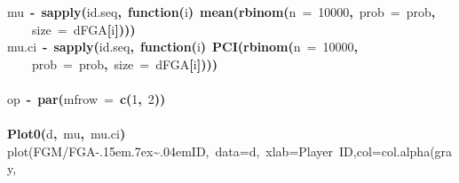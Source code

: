 \documentclass{article}
\makeatletter
\newcommand{\hlnumber}[1]{\textcolor[rgb]{0,0,0}{#1}}%
\newcommand{\hlfunctioncall}[1]{\textcolor[rgb]{.5,0,.33}{\textbf{#1}}}%
\newcommand{\hlkeyword}[1]{\textbf{#1}}%
\newcommand{\hlargument}[1]{\textcolor[rgb]{.69,.25,.02}{#1}}%
\newcommand{\hlcomment}[1]{\textcolor[rgb]{.18,.6,.34}{#1}}%
\newcommand{\hlformalargs}[1]{\hlargument{#1}}%
\newcommand{\hlassignement}[1]{\textbf{#1}}%
\newcommand{\hlsymbol}[1]{#1}%
\def\urltilda{\kern -.15em\lower .7ex\hbox{\~{}}\kern .04em}%
\newcommand{\hlstd}[1]{\textcolor[rgb]{0,0,0}{#1}}%
\newenvironment{kframe}{%
 \def\FrameCommand##1{\hskip\@totalleftmargin \hskip-\fboxsep
 \colorbox{shadecolor}{##1}\hskip-\fboxsep
     \hskip-\linewidth \hskip-\@totalleftmargin \hskip\columnwidth}%
 \MakeFramed {\advance\hsize-\width
   \@totalleftmargin\z@ \linewidth\hsize
   \@setminipage}}%
 {\par\unskip\endMakeFramed}
\newenvironment{knitrout}{}{} %
\makeatother
\begin{document}
\begin{knitrout}
{\begin{kframe}
\begin{flushleft}
\hlstd{}\hlsymbol{mu}{\ }\hlassignement{\usebox{\hlnormalsizeboxlessthan}-}{\ }\hlfunctioncall{sapply}\hlkeyword{(}\hlsymbol{id.seq}\hlkeyword{,}{\ }\hlkeyword{function}\hlkeyword{(}\hlformalargs{i}\hlkeyword{)}{\ }\hlfunctioncall{mean}\hlkeyword{(}\hlfunctioncall{rbinom}\hlkeyword{(}\hlargument{n}{\ }\hlargument{=}{\ }\hlnumber{10000}\hlkeyword{,}{\ }\hlargument{prob}{\ }\hlargument{=}{\ }\hlsymbol{prob}\hlkeyword{,}\hspace*{\fill}\\
\hlstd{}{\ }{\ }{\ }{\ }\hlargument{size}{\ }\hlargument{=}{\ }\hlsymbol{d}\hlkeyword{\usebox{\hlnormalsizeboxdollar}}\hlsymbol{FGA}\hlkeyword{[}\hlsymbol{i}\hlkeyword{]}\hlkeyword{)}\hlkeyword{)}\hlkeyword{)}\hspace*{\fill}\\
\hlstd{}\hlsymbol{mu.ci}{\ }\hlassignement{\usebox{\hlnormalsizeboxlessthan}-}{\ }\hlfunctioncall{sapply}\hlkeyword{(}\hlsymbol{id.seq}\hlkeyword{,}{\ }\hlkeyword{function}\hlkeyword{(}\hlformalargs{i}\hlkeyword{)}{\ }\hlfunctioncall{PCI}\hlkeyword{(}\hlfunctioncall{rbinom}\hlkeyword{(}\hlargument{n}{\ }\hlargument{=}{\ }\hlnumber{10000}\hlkeyword{,}\hspace*{\fill}\\
\hlstd{}{\ }{\ }{\ }{\ }\hlargument{prob}{\ }\hlargument{=}{\ }\hlsymbol{prob}\hlkeyword{,}{\ }\hlargument{size}{\ }\hlargument{=}{\ }\hlsymbol{d}\hlkeyword{\usebox{\hlnormalsizeboxdollar}}\hlsymbol{FGA}\hlkeyword{[}\hlsymbol{i}\hlkeyword{]}\hlkeyword{)}\hlkeyword{)}\hlkeyword{)}\hspace*{\fill}\\
\hlstd{}\hspace*{\fill}\\
\hlstd{}\hlsymbol{op}{\ }\hlassignement{\usebox{\hlnormalsizeboxlessthan}-}{\ }\hlfunctioncall{par}\hlkeyword{(}\hlargument{mfrow}{\ }\hlargument{=}{\ }\hlfunctioncall{c}\hlkeyword{(}\hlnumber{1}\hlkeyword{,}{\ }\hlnumber{2}\hlkeyword{)}\hlkeyword{)}\hspace*{\fill}\\
\hlstd{}\hspace*{\fill}\\
\hlstd{}\hlfunctioncall{Plot0}\hlkeyword{(}\hlsymbol{d}\hlkeyword{,}{\ }\hlsymbol{mu}\hlkeyword{,}{\ }\hlsymbol{mu.ci}\hlkeyword{)}\hspace*{\fill}\\
\hlstd{}\hlcomment{\usebox{\hlnormalsizeboxhash}\usebox{\hlnormalsizeboxhash}{\ }plot(FGM/FGA\urltilda{}ID,{\ }data=d,{\ }xlab=\usebox{\hlnormalsizeboxsinglequote}Player{\ }ID\usebox{\hlnormalsizeboxsinglequote},col=col.alpha(\usebox{\hlnormalsizeboxsinglequote}gray\usebox{\hlnormalsizeboxsinglequote},}\hspace*{\fill}\\

\end{flushleft}
\end{kframe}}
\end{knitrout}
\end{document}
